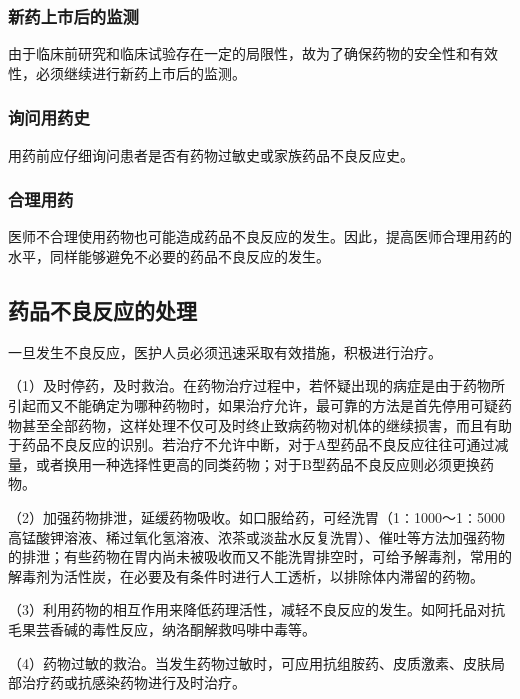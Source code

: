 \subsubsection{新药上市后的监测}

由于临床前研究和临床试验存在一定的局限性，故为了确保药物的安全性和有效性，必须继续进行新药上市后的监测。

\subsubsection{询问用药史}

用药前应仔细询问患者是否有药物过敏史或家族药品不良反应史。

\subsubsection{合理用药}

医师不合理使用药物也可能造成药品不良反应的发生。因此，提高医师合理用药的水平，同样能够避免不必要的药品不良反应的发生。

\subsection{药品不良反应的处理}

一旦发生不良反应，医护人员必须迅速采取有效措施，积极进行治疗。

（1）及时停药，及时救治。在药物治疗过程中，若怀疑出现的病症是由于药物所引起而又不能确定为哪种药物时，如果治疗允许，最可靠的方法是首先停用可疑药物甚至全部药物，这样处理不仅可及时终止致病药物对机体的继续损害，而且有助于药品不良反应的识别。若治疗不允许中断，对于A型药品不良反应往往可通过减量，或者换用一种选择性更高的同类药物；对于B型药品不良反应则必须更换药物。

（2）加强药物排泄，延缓药物吸收。如口服给药，可经洗胃（1∶1000～1∶5000高锰酸钾溶液、稀过氧化氢溶液、浓茶或淡盐水反复洗胃）、催吐等方法加强药物的排泄；有些药物在胃内尚未被吸收而又不能洗胃排空时，可给予解毒剂，常用的解毒剂为活性炭，在必要及有条件时进行人工透析，以排除体内滞留的药物。

（3）利用药物的相互作用来降低药理活性，减轻不良反应的发生。如阿托品对抗毛果芸香碱的毒性反应，纳洛酮解救吗啡中毒等。

（4）药物过敏的救治。当发生药物过敏时，可应用抗组胺药、皮质激素、皮肤局部治疗药或抗感染药物进行及时治疗。

